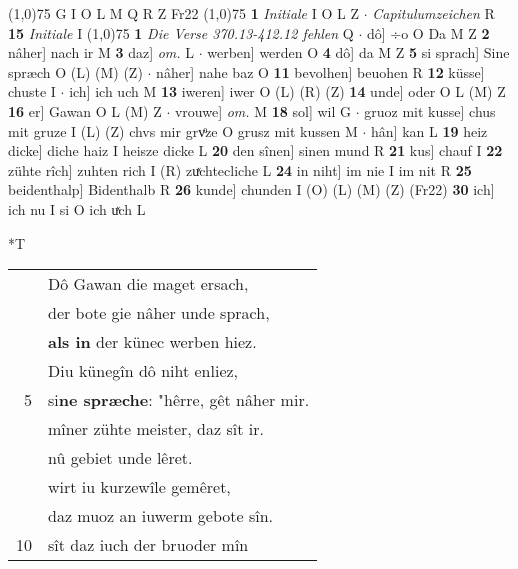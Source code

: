 \documentclass[8pt,a4paper,notitlepage]{article}
\begin{document}
\begin{table}[ht]
\begin{minipage}[t]{0.5\linewidth}
\begin{tabular}{rl}
\end{tabular}
\scriptsize
\line(1,0){75} \newline
G I O L M Q R Z Fr22 \newline
\line(1,0){75} \newline
\textbf{1} \textit{Initiale} I O L Z   $\cdot$ \textit{Capitulumzeichen} R  \textbf{15} \textit{Initiale} I  \newline
\line(1,0){75} \newline
\textbf{1} \textit{Die Verse 370.13-412.12 fehlen} Q   $\cdot$ dô] ÷o O Da M Z \textbf{2} nâher] nach ir M \textbf{3} daz] \textit{om.} L  $\cdot$ werben] werden O \textbf{4} dô] da M Z \textbf{5} si sprach] Sine spræch O (L) (M) (Z)  $\cdot$ nâher] nahe baz O \textbf{11} bevolhen] beuohen R \textbf{12} küsse] chuste I  $\cdot$ ich] ich uch M \textbf{13} iweren] iwer O (L) (R) (Z) \textbf{14} unde] oder O L (M) Z \textbf{16} er] Gawan O L (M) Z  $\cdot$ vrouwe] \textit{om.} M \textbf{18} sol] wil G  $\cdot$ gruoz mit kusse] chus mit gruze I (L) (Z) chvs mir grvͦze O grusz mit kussen M  $\cdot$ hân] kan L \textbf{19} heiz dicke] diche haiz I heisze dicke L \textbf{20} den sînen] sinen mund R \textbf{21} kus] chauf I \textbf{22} zühte rîch] zuhten rich I (R) zuͯchtecliche L \textbf{24} in niht] im nie I im nit R \textbf{25} beidenthalp] Bidenthalb R \textbf{26} kunde] chunden I (O) (L) (M) (Z) (Fr22) \textbf{30} ich] ich nu I si O ich uͯch L \newline
\end{minipage}
\hspace{0.5cm}
\begin{minipage}[t]{0.5\linewidth}
\small
\begin{center}*T
\end{center}
\begin{tabular}{rl}
 & Dô Gawan die maget ersach,\\ 
 & der bote gie nâher unde sprach,\\ 
 & \textbf{als in} der künec werben hiez.\\ 
 & Diu künegîn dô niht enliez,\\ 
5 & si\textbf{ne spræche}: "hêrre, gêt nâher mir.\\ 
 & mîner zühte meister, daz sît ir.\\ 
 & nû gebiet unde lêret.\\ 
 & wirt iu kurzewîle gemêret,\\ 
 & daz muoz an iuwerm gebote sîn.\\ 
10 & sît daz iuch der bruoder mîn\\ 

\end{tabular}
\end{minipage}
\end{table}
\end{document}

